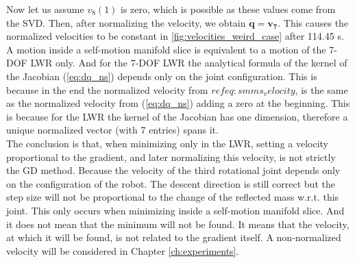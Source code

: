 Now let us assume  $v_8(1)$ is zero, which is possible as these values come from the SVD. Then, after normalizing the velocity, we obtain $\mathbf{\dot{q} =v_7 }$. This causes the normalized velocities to be constant in  \ref{fig:velocities_weird_case} after 114.45 s.\\
%
A motion inside a self-motion manifold slice is equivalent to a motion of the 7-DOF LWR only. And for the 7-DOF LWR the analytical formula of the kernel of the Jacobian (\ref{eq:dq_ns}) depends only on the joint configuration. This is because in the end the normalized velocity from \(ref{eq:smms_velocity}\), is the same as the normalized velocity from (\ref{eq:dq_ns}) adding a zero at the beginning. This is because for the LWR the kernel of the Jacobian has one dimension, therefore a unique normalized vector (with 7 entries) spans it. \\
The conclusion is that, when minimizing only in the LWR, setting a velocity proportional to the gradient, and later normalizing this velocity, is not strictly the GD method. Because the velocity of the third rotational joint depends only on the configuration of the robot. The descent direction is still correct but the step size will not be proportional to the change of the reflected mass w.r.t. this joint. 
This only occurs when minimizing inside a self-motion manifold slice.  And it does not mean that the minimum will not be found. It means that the velocity, at which it will be found, is not related to the gradient itself.
A non-normalized velocity will be considered in  Chapter  \ref{ch:experiments}.






